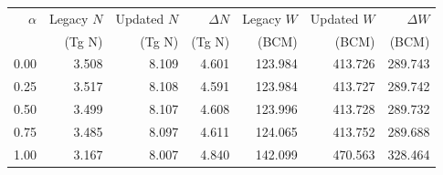 \begin{tabular}{rrrrrrr}
\toprule
$\alpha$ & Legacy $N$ & Updated $N$ & $\Delta N$ & Legacy $W$ & Updated $W$ & $\Delta W$ \\
& (Tg N) & (Tg N) & (Tg N) & (BCM) & (BCM) & (BCM) \\
\midrule
0.00 & 3.508 & 8.109 & 4.601 & 123.984 & 413.726 & 289.743 \\
0.25 & 3.517 & 8.108 & 4.591 & 123.984 & 413.727 & 289.742 \\
0.50 & 3.499 & 8.107 & 4.608 & 123.996 & 413.728 & 289.732 \\
0.75 & 3.485 & 8.097 & 4.611 & 124.065 & 413.752 & 289.688 \\
1.00 & 3.167 & 8.007 & 4.840 & 142.099 & 470.563 & 328.464 \\
\bottomrule
\end{tabular}
